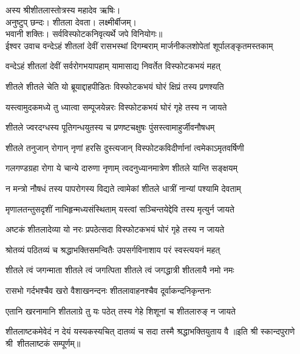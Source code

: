 
अस्य श्रीशीतलास्तोत्रस्य महादेव ऋषिः।\\
अनुष्टुप् छन्दः। शीतला देवता। लक्ष्मीर्बीजम्।\\
भवानी शक्तिः। सर्वविस्फोटकनिवृत्यर्थे जपे विनियोगः॥\\

ईश्वर उवाच
\twolineshloka
{वन्देऽहं शीतलां देवीं रासभस्थां दिगम्बराम्}
{मार्जनीकलशोपेतां शूर्पालङ्कृतमस्तकाम्}

\twolineshloka
{वन्देऽहं शीतलां देवीं सर्वरोगभयापहाम्}
{यामासाद्य निवर्तेत विस्फोटकभयं महत्}

\twolineshloka
{शीतले शीतले चेति यो ब्रूयाद्दाहपीडितः}
{विस्फोटकभयं घोरं क्षिप्रं तस्य प्रणश्यति}

\twolineshloka
{यस्त्वामुदकमध्ये तु ध्यात्वा सम्पूजयेन्नरः}
{विस्फोटकभयं घोरं गृहे तस्य न जायते}

\twolineshloka
{शीतले ज्वरदग्धस्य पूतिगन्धयुतस्य च}
{प्रणष्टचक्षुषः पुंसस्त्वामाहुर्जीवनौषधम्}

\twolineshloka
{शीतले तनुजान् रोगान् नृणां हरसि दुस्त्यजान्}
{विस्फोटकविदीर्णानां त्वमेकाऽमृतवर्षिणी}

\twolineshloka
{गलगण्डग्रहा रोगा ये चान्ये दारुणा नृणाम्}
{त्वदनुध्यानमात्रेण शीतले यान्ति सङ्क्षयम्}

\twolineshloka
{न मन्त्रो नौषधं तस्य पापरोगस्य विद्यते}
{त्वामेकां शीतले धात्रीं नान्यां पश्यामि देवताम्}

\twolineshloka
{मृणालतन्तुसदृशीं नाभिहृन्मध्यसंस्थिताम्}
{यस्त्वां सञ्चिन्तयेद्देवि तस्य मृत्युर्न जायते}

\twolineshloka
{अष्टकं शीतलादेव्या यो नरः प्रपठेत्सदा}
{विस्फोटकभयं घोरं गृहे तस्य न जायते}

\twolineshloka
{श्रोतव्यं पठितव्यं च श्रद्धाभक्तिसमन्वितैः}
{उपसर्गविनाशाय परं स्वस्त्ययनं महत्}

\twolineshloka
{शीतले त्वं जगन्माता शीतले त्वं जगत्पिता}
{शीतले त्वं जगद्धात्री शीतलायै नमो नमः}

\twolineshloka
{रासभो गर्दभश्चैव खरो वैशाखनन्दनः}
{शीतलावाहनश्चैव दूर्वाकन्दनिकृन्तनः}

\twolineshloka
{एतानि खरनामानि शीतलाग्रे तु यः पठेत्}
{तस्य गेहे शिशूनां च शीतलारुङ् न जायते}

\twolineshloka
{शीतलाष्टकमेवेदं न देयं यस्यकस्यचित्}
{दातव्यं च सदा तस्मै श्रद्धाभक्तियुताय वै}
॥इति श्री स्कान्दपुराणे श्री~शीतलाष्टकं सम्पूर्णम्॥